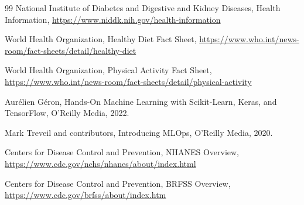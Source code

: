 \documentclass[12pt,a4paper,openany]{report}
\begin{document}
\begin{thebibliography}{99}
    National Institute of Diabetes and Digestive and Kidney Diseases,
    Health Information,
    \url{https://www.niddk.nih.gov/health-information}

    World Health Organization,
    Healthy Diet Fact Sheet,
    \url{https://www.who.int/news-room/fact-sheets/detail/healthy-diet}

    World Health Organization,
    Physical Activity Fact Sheet,
    \url{https://www.who.int/news-room/fact-sheets/detail/physical-activity}

    Aurélien Géron,
    Hands-On Machine Learning with Scikit-Learn, Keras, and TensorFlow,
    O'Reilly Media, 2022.

    Mark Treveil and contributors,
    Introducing MLOps,
    O'Reilly Media, 2020.

    Centers for Disease Control and Prevention,                                                 
    NHANES Overview,
    \url{https://www.cdc.gov/nchs/nhanes/about/index.html}

    Centers for Disease Control and Prevention,
    BRFSS Overview,
    \url{https://www.cdc.gov/brfss/about/index.htm}

    \end{thebibliography}

    
\end{document}
